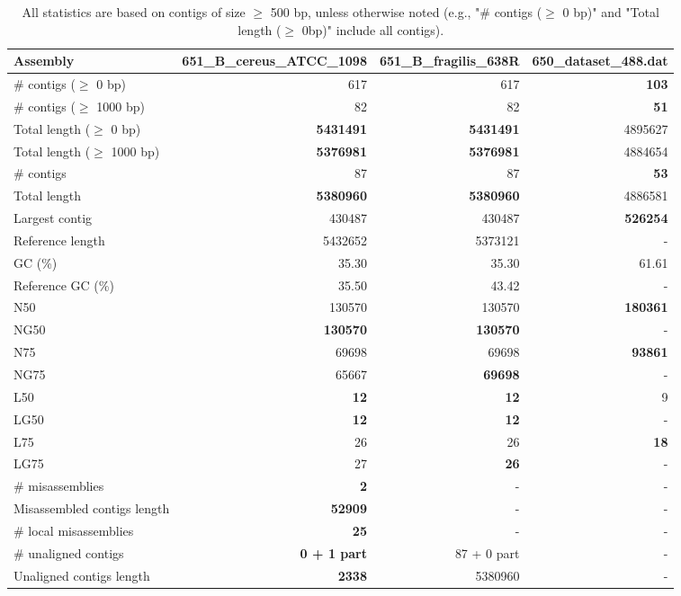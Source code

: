 \documentclass[12pt,a4paper]{article}
\begin{document}
\begin{table}[ht]
\begin{center}
\caption{All statistics are based on contigs of size $\geq$ 500 bp, unless otherwise noted (e.g., "\# contigs ($\geq$ 0 bp)" and "Total length ($\geq$ 0bp)" include all contigs).}
\begin{tabular}{|l*{3}{|r}|}
\hline
Assembly & 651\_B\_cereus\_ATCC\_1098 & 651\_B\_fragilis\_638R & 650\_dataset\_488.dat \\ \hline
\# contigs ($\geq$ 0 bp) & 617 & 617 & {\bf 103} \\ \hline
\# contigs ($\geq$ 1000 bp) & 82 & 82 & {\bf 51} \\ \hline
Total length ($\geq$ 0 bp) & {\bf 5431491} & {\bf 5431491} & 4895627 \\ \hline
Total length ($\geq$ 1000 bp) & {\bf 5376981} & {\bf 5376981} & 4884654 \\ \hline
\# contigs & 87 & 87 & {\bf 53} \\ \hline
Total length & {\bf 5380960} & {\bf 5380960} & 4886581 \\ \hline
Largest contig & 430487 & 430487 & {\bf 526254} \\ \hline
Reference length & 5432652 & 5373121 & - \\ \hline
GC (\%) & 35.30 & 35.30 & 61.61 \\ \hline
Reference GC (\%) & 35.50 & 43.42 & - \\ \hline
N50 & 130570 & 130570 & {\bf 180361} \\ \hline
NG50 & {\bf 130570} & {\bf 130570} & - \\ \hline
N75 & 69698 & 69698 & {\bf 93861} \\ \hline
NG75 & 65667 & {\bf 69698} & - \\ \hline
L50 & {\bf 12} & {\bf 12} & 9 \\ \hline
LG50 & {\bf 12} & {\bf 12} & - \\ \hline
L75 & 26 & 26 & {\bf 18} \\ \hline
LG75 & 27 & {\bf 26} & - \\ \hline
\# misassemblies & {\bf 2} & - & - \\ \hline
Misassembled contigs length & {\bf 52909} & - & - \\ \hline
\# local misassemblies & {\bf 25} & - & - \\ \hline
\# unaligned contigs & {\bf 0 + 1 part} & 87 + 0 part & - \\ \hline
Unaligned contigs length & {\bf 2338} & 5380960 & - \\ \hline

\end{tabular}
\end{center}
\end{table}
\end{document}
